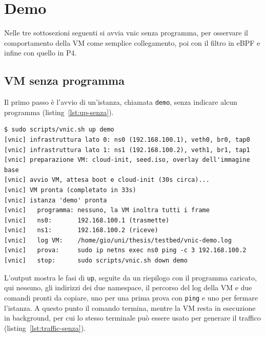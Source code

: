 \section{Demo}\label{sec:demo}

Nelle tre sottosezioni seguenti si avvia vnic senza programma, per osservare il comportamento della VM come semplice collegamento, poi con il filtro in eBPF e infine con quello in P4.

\subsection{VM senza programma}

Il primo passo è l'avvio di un'istanza, chiamata \texttt{demo}, senza indicare alcun programma (listing~\ref{lst:up-senza}).

\noindent\begin{minipage}{\linewidth}
\begin{lstlisting}[style=terminale, caption={Avvio di vnic senza programma}, label={lst:up-senza}]
$ sudo scripts/vnic.sh up demo
[vnic] infrastruttura lato 0: ns0 (192.168.100.1), veth0, br0, tap0
[vnic] infrastruttura lato 1: ns1 (192.168.100.2), veth1, br1, tap1
[vnic] preparazione VM: cloud-init, seed.iso, overlay dell'immagine base
[vnic] avvio VM, attesa boot e cloud-init (30s circa)...
[vnic] VM pronta (completato in 33s)
[vnic] istanza 'demo' pronta
[vnic]   programma: nessuno, la VM inoltra tutti i frame
[vnic]   ns0:       192.168.100.1 (trasmette)
[vnic]   ns1:       192.168.100.2 (riceve)
[vnic]   log VM:    /home/gio/uni/thesis/testbed/vnic-demo.log
[vnic]   prova:     sudo ip netns exec ns0 ping -c 3 192.168.100.2
[vnic]   stop:      sudo scripts/vnic.sh down demo
\end{lstlisting}
\end{minipage}

L'output mostra le fasi di \texttt{up}, seguite da un riepilogo con il programma caricato, qui nessuno, gli indirizzi dei due namespace, il percorso del log della VM e due comandi pronti da copiare, uno per una prima prova con \texttt{ping} e uno per fermare l'istanza. A questo punto il comando termina, mentre la VM resta in esecuzione in background, per cui lo stesso terminale può essere usato per generare il traffico (listing~\ref{lst:traffic-senza}).

